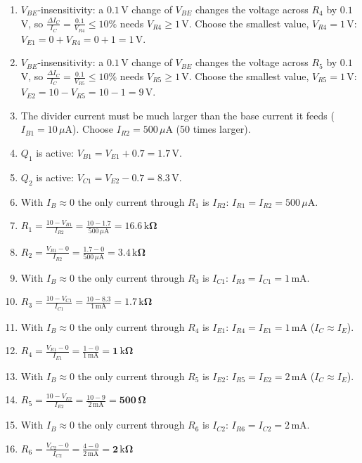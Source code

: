 \documentclass[11pt]{article}
\newcommand{\solstep}[2]{\par\medskip{\color{stepc}\textbf{Step #1 --- #2}}\par\nopagebreak}
\begin{document}
\solstep{2}{Design, node by node}\begin{enumerate}[leftmargin=*,itemsep=3pt]
\item $V_{BE}$-insensitivity: a $0.1$\,V change of $V_{BE}$ changes the voltage across $R_{4}$ by $0.1$\,V, so $\frac{\Delta I_C}{I_C} = \frac{0.1}{V_{R4}} \le 10\%$ needs $V_{R4} \ge 1$\,V. Choose the smallest value, $V_{R4} = 1$\,V: $V_{E1} = 0 + V_{R4} = 0 + 1 = 1\,\mathrm{V}$.
\item $V_{BE}$-insensitivity: a $0.1$\,V change of $V_{BE}$ changes the voltage across $R_{5}$ by $0.1$\,V, so $\frac{\Delta I_C}{I_C} = \frac{0.1}{V_{R5}} \le 10\%$ needs $V_{R5} \ge 1$\,V. Choose the smallest value, $V_{R5} = 1$\,V: $V_{E2} = 10 - V_{R5} = 10 - 1 = 9\,\mathrm{V}$.
\item The divider current must be much larger than the base current it feeds ($I_{B1} = 10\,\mu \mathrm{A}$). Choose $I_{R2} = 500\,\mu \mathrm{A}$ (50 times larger).
\item $Q_{1}$ is active: $V_{B1} = V_{E1} + 0.7 = 1.7\,\mathrm{V}$.
\item $Q_{2}$ is active: $V_{C1} = V_{E2} - 0.7 = 8.3\,\mathrm{V}$.
\item With $I_B\approx0$ the only current through $R_{1}$ is $I_{R2}$: $I_{R1} = I_{R2} = 500\,\mu \mathrm{A}$.
\item $\displaystyle R_{1} = \frac{10 - V_{B1}}{I_{R2}} = \frac{10 - 1.7}{500\,\mu \mathrm{A}} = \mathbf{16.6\,\mathrm{k}\Omega}$
\item $\displaystyle R_{2} = \frac{V_{B1} - 0}{I_{R2}} = \frac{1.7 - 0}{500\,\mu \mathrm{A}} = \mathbf{3.4\,\mathrm{k}\Omega}$
\item With $I_B\approx0$ the only current through $R_{3}$ is $I_{C1}$: $I_{R3} = I_{C1} = 1\,\mathrm{m}\mathrm{A}$.
\item $\displaystyle R_{3} = \frac{10 - V_{C1}}{I_{C1}} = \frac{10 - 8.3}{1\,\mathrm{m}\mathrm{A}} = \mathbf{1.7\,\mathrm{k}\Omega}$
\item With $I_B\approx0$ the only current through $R_{4}$ is $I_{E1}$: $I_{R4} = I_{E1} = 1\,\mathrm{m}\mathrm{A}$ ($I_C\approx I_E$).
\item $\displaystyle R_{4} = \frac{V_{E1} - 0}{I_{E1}} = \frac{1 - 0}{1\,\mathrm{m}\mathrm{A}} = \mathbf{1\,\mathrm{k}\Omega}$
\item With $I_B\approx0$ the only current through $R_{5}$ is $I_{E2}$: $I_{R5} = I_{E2} = 2\,\mathrm{m}\mathrm{A}$ ($I_C\approx I_E$).
\item $\displaystyle R_{5} = \frac{10 - V_{E2}}{I_{E2}} = \frac{10 - 9}{2\,\mathrm{m}\mathrm{A}} = \mathbf{500\,\Omega}$
\item With $I_B\approx0$ the only current through $R_{6}$ is $I_{C2}$: $I_{R6} = I_{C2} = 2\,\mathrm{m}\mathrm{A}$.
\item $\displaystyle R_{6} = \frac{V_{C2} - 0}{I_{C2}} = \frac{4 - 0}{2\,\mathrm{m}\mathrm{A}} = \mathbf{2\,\mathrm{k}\Omega}$
\end{enumerate}
\end{document}
